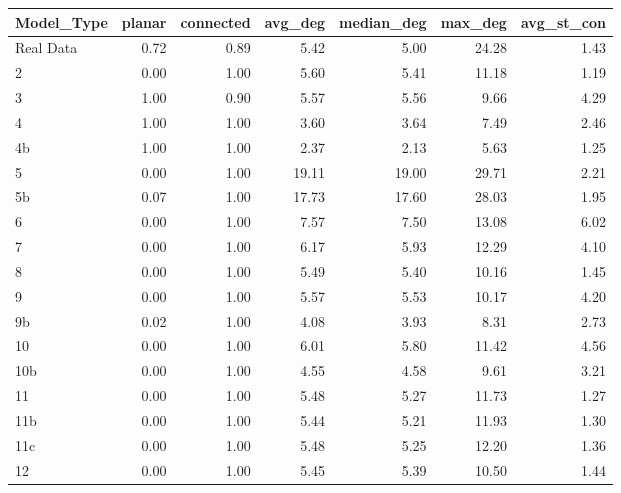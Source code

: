 \begin{tabular}{lrrrrrr}
\toprule
Model_Type & planar & connected & avg_deg & median_deg & max_deg & avg_st_con \\
\midrule
Real Data & 0.72 & 0.89 & 5.42 & 5.00 & 24.28 & 1.43 \\
2 & 0.00 & 1.00 & 5.60 & 5.41 & 11.18 & 1.19 \\
3 & 1.00 & 0.90 & 5.57 & 5.56 & 9.66 & 4.29 \\
4 & 1.00 & 1.00 & 3.60 & 3.64 & 7.49 & 2.46 \\
4b & 1.00 & 1.00 & 2.37 & 2.13 & 5.63 & 1.25 \\
5 & 0.00 & 1.00 & 19.11 & 19.00 & 29.71 & 2.21 \\
5b & 0.07 & 1.00 & 17.73 & 17.60 & 28.03 & 1.95 \\
6 & 0.00 & 1.00 & 7.57 & 7.50 & 13.08 & 6.02 \\
7 & 0.00 & 1.00 & 6.17 & 5.93 & 12.29 & 4.10 \\
8 & 0.00 & 1.00 & 5.49 & 5.40 & 10.16 & 1.45 \\
9 & 0.00 & 1.00 & 5.57 & 5.53 & 10.17 & 4.20 \\
9b & 0.02 & 1.00 & 4.08 & 3.93 & 8.31 & 2.73 \\
10 & 0.00 & 1.00 & 6.01 & 5.80 & 11.42 & 4.56 \\
10b & 0.00 & 1.00 & 4.55 & 4.58 & 9.61 & 3.21 \\
11 & 0.00 & 1.00 & 5.48 & 5.27 & 11.73 & 1.27 \\
11b & 0.00 & 1.00 & 5.44 & 5.21 & 11.93 & 1.30 \\
11c & 0.00 & 1.00 & 5.48 & 5.25 & 12.20 & 1.36 \\
12 & 0.00 & 1.00 & 5.45 & 5.39 & 10.50 & 1.44 \\
\bottomrule
\end{tabular}
